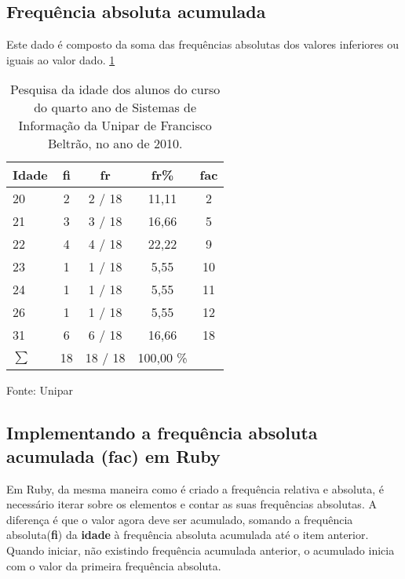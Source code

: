 \documentclass[12pt]{article}
\newcommand{\code}[1] {\textbf{#1}}
\begin{document}
\subsection{ Frequência absoluta acumulada} 

Este dado é composto da soma das frequências absolutas dos valores inferiores ou iguais ao valor dado. \ref{tabela FAC percentual}

\begin{table}
\caption{Pesquisa da idade dos alunos do curso do quarto ano de Sistemas de Informação da Unipar de Francisco Beltrão, no ano de 2010.}
\label{tabela FAC percentual}
\begin{tabular}{|l|c|c|c|c|} 
\hline 

Idade &  \code{fi} & \code{fr}  & \code{fr\%} & \code{fac}\\ \hline 
20    &      2       &      2 / 18  &   11,11  &      2 \\ 
21    &      3       &      3 / 18  &   16,66  &      5 \\
22    &      4       &      4 / 18  &   22,22  &      9 \\
23    &      1       &      1 / 18  &    5,55  &     10 \\
24    &      1       &      1 / 18  &    5,55  &     11 \\
26    &      1       &      1 / 18  &    5,55  &     12 \\
31    &      6       &      6 / 18  &   16,66  &     18 \\ 
\hline 
\begin{math}
\sum 
\end{math} & 18      &     18 / 18  & 100,00 \% & \\
\hline 
\end{tabular}
\small{Fonte: Unipar}
\end{table}


\subsection{ Implementando a frequência absoluta acumulada (fac) em Ruby} 

Em Ruby, da mesma maneira como é criado a frequência relativa e absoluta, é necessário iterar sobre os elementos e contar as suas frequências absolutas. A diferença é que o valor agora deve ser acumulado, somando a frequência absoluta(\code{fi}) da \code{idade } à frequência absoluta acumulada até o item anterior. Quando iniciar, não existindo frequência acumulada anterior, o acumulado inicia com o valor da primeira frequência absoluta.
\end{document}

